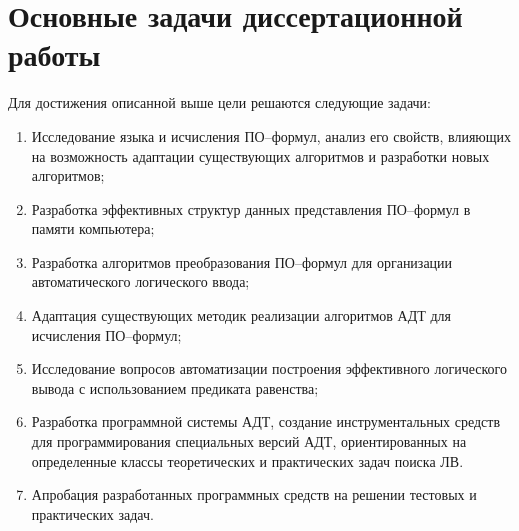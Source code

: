 \section*{Основные задачи диссертационной работы}
Для достижения описанной выше цели решаются следующие задачи:
\begin{enumerate}
\item Исследование языка и исчисления ПО--формул, анализ его свойств, влияющих на возможность адаптации существующих алгоритмов и разработки новых алгоритмов;
\item Разработка эффективных структур данных представления ПО--формул в памяти компьютера;
\item Разработка алгоритмов преобразования ПО--формул для организации автоматического логического ввода;
\item Адаптация существующих методик реализации алгоритмов АДТ для исчисления ПО--формул;
\item Исследование вопросов автоматизации построения эффективного логического вывода с использованием предиката равенства;
\item Разработка программной системы АДТ, создание инструментальных средств для программирования специальных версий АДТ, ориентированных на определенные классы теоретических и практических задач поиска ЛВ.
\item Апробация разработанных программных средств на решении тестовых и практических задач.
\end{enumerate}


